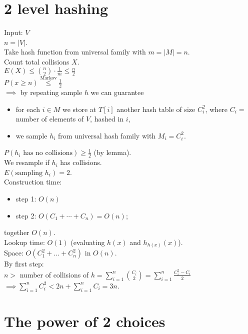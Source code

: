 \documentclass[a4paper, 12pt]{book}
\theoremstyle{definition}
\theoremstyle{remark}
\begin{document}
\section{2 level hashing}

Input: $V$ \\
$n = |V|$. \\
Take hash function from universal family with $m = |M| = n$. \\
Count total collisions $X$. \\
$E(X) \leq \binom{n}{2} \cdot \frac{1}{m} \leq \frac{n}{2}$ \\
$P(x \geq n) \stackrel{\text{Markov}}{\leq} \frac{1}{2}$ \\
$\implies$ by repeating sample $h$ we can guarantee
\begin{itemize}
  \item for each $i \in M$ we store at $T[i]$ another hash table of size $C_i^2$,
    where $C_i = $ number of elements of $V$, hashed in $i$,
  \item we sample $h_i$ from universal hash family with $M_i = C_i^2$.
\end{itemize}
$P(h_i \text{ has no collisions}) \geq \frac{1}{2}$ (by lemma). \\
We resample if $h_i$ has collisions. \\
$E(\text{sampling } h_i) = 2$. \\
Construction time:
\begin{itemize}
  \item step 1: $O(n)$
  \item step 2: $O(C_1 + \cdots + C_n) = O(n)$;
\end{itemize}
together $O(n)$. \\
Lookup time: $O(1)$ (evaluating $h(x)$ and $h_{h(x)}(x)$). \\
Space: $O(C_1^2 + \dots + C_n^2)$ in $O(n)$. \\
By first step: \\
$n >$ number of collisions of $h = \sum_{i=1}^{n} \binom{C_i}{2} = \sum_{i=1}^{n} \frac{C_i^2 - C_i}{2}$ \\
$\implies \sum_{i=1}^{n} C_i^2 < 2n + \sum_{i=1}^{n} C_i = 3n$.


\section{The power of 2 choices}
\end{document}
